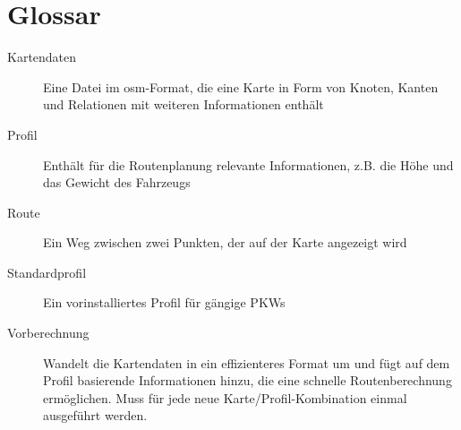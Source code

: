 \documentclass[a4paper, 11pt]{article}
\begin{document}
\section{Glossar}
\begin{description}
\item[Kartendaten] Eine Datei im osm-Format, die eine Karte in Form von Knoten, Kanten und Relationen mit weiteren Informationen enthält\\
\item[Profil]
Enthält für die Routenplanung relevante Informationen, z.B. die Höhe und das Gewicht des Fahrzeugs\\
\item[Route]
Ein Weg zwischen zwei Punkten, der auf der Karte angezeigt wird\\
\item[Standardprofil]
Ein vorinstalliertes Profil für gängige PKWs\\
\item[Vorberechnung] Wandelt die Kartendaten in ein effizienteres Format um und fügt auf dem Profil basierende Informationen hinzu, die eine schnelle Routenberechnung ermöglichen. Muss für jede neue Karte/Profil-Kombination einmal ausgeführt werden.
\end{description}
\end{document}
